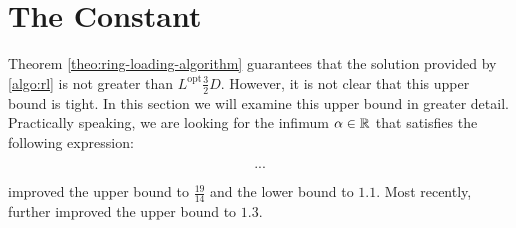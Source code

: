 \section{The Constant}

Theorem \cref{theo:ring-loading-algorithm} guarantees that the solution provided by \cref{algo:rl} is not greater than $L^\mathrm{opt}\frac{3}{2} D$.
However, it is not clear that this upper bound is tight.
In this section we will examine this upper bound in greater detail.
Practically speaking, we are looking for the infimum $\alpha \in \mathbb{R}$ that satisfies the following expression:

\begin{equation}
	...
\end{equation}

\citet{skutella16} improved the upper bound to $\frac{19}{14}$ and the lower bound to $1.1$.
Most recently, \citet{daubel19} further improved the upper bound to $1.3$.